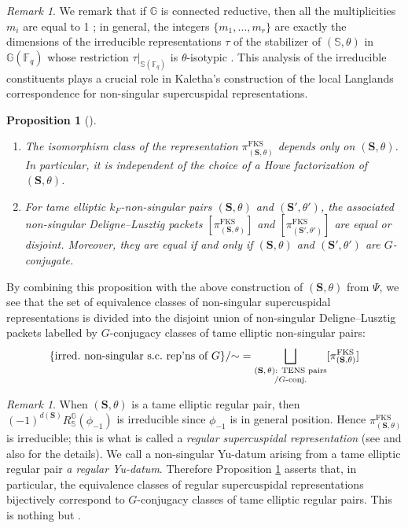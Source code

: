 \documentclass{amsart}
\newcommand{\FKS}{\mathrm{FKS}}
\newcommand{\FF}{\mathbb{F}}
\newcommand{\bbS}{\mathbb{S}}
\newcommand{\bbG}{\mathbb{G}}
\newcommand{\bfS}{\mathbf{S}}
\theoremstyle{plain}
\newtheorem{prop}[thm]{Proposition}
\theoremstyle{definition}
\theoremstyle{remark}
\newtheorem{rem}[thm]{Remark}
\theoremstyle{theorem}
\begin{document}
\begin{rem}\label{rem:parametrization}
We remark that if $\bbG$ is connected reductive, then all the multiplicities $m_i$ are equal to 1 \cite{Lus88}; in general, the integers $\{m_1,\ldots, m_r\}$ are exactly the dimensions of the irreducible representations $\tau$ of the stabilizer of $(\bbS,\theta)$ in $\bbG(\FF_q)$ whose restriction $\tau|_{\bbS(\FF_q)}$ is $\theta$-isotypic \cite{Kal19-sc}. 
This analysis of the irreducible constituents plays a crucial role in Kaletha's construction of the local Langlands correspondence for non-singular supercuspidal representations.
\end{rem}

\begin{prop}[{\cite[Corollary 3.4.7]{Kal19-sc}}]\label{prop:DL-packet}
\begin{enumerate}
\item
The isomorphism class of the representation $\pi_{(\bfS,\theta)}^{\FKS}$ depends only on $(\bfS,\theta)$.
In particular, it is independent of the choice of a Howe factorization of $(\bfS,\theta)$.
\item
For tame elliptic $k_{F}$-non-singular pairs $(\bfS,\theta)$ and $(\bfS',\theta')$, the associated non-singular Deligne--Lusztig packets $[\pi_{(\bfS,\theta)}^{\FKS}]$ and $[\pi_{(\bfS',\theta')}^{\FKS}]$ are equal or disjoint.
Moreover, they are equal if and only if $(\bfS,\theta)$ and $(\bfS',\theta')$ are $G$-conjugate.
\end{enumerate}
\end{prop}

By combining this proposition with the above construction of $(\bfS,\theta)$ from $\Psi$, we see that the set of equivalence classes of non-singular supercuspidal representations is divided into the disjoint union of non-singular Deligne--Lusztig packets labelled by $G$-conjugacy classes of tame elliptic non-singular pairs:
\[
\{\text{irred.\ non-singular s.c.\ rep'ns of $G$}\}/{\sim}
=
\bigsqcup_{\begin{subarray}{c} \text{$(\bfS,\theta)$: TENS pairs}\\ /\text{$G$-conj.}\end{subarray}}
[\pi_{(\bfS,\theta)}^{\FKS}]
\]

\begin{rem}\label{rem:regular}
When $(\bfS,\theta)$ is a tame elliptic regular pair, then $(-1)^{d(\bfS)}R_{\bbS}^{\bbG}(\phi_{-1})$ is irreducible since $\phi_{-1}$ is in general position.
Hence $\pi_{(\bfS,\theta)}^{\FKS}$ is irreducible; this is what is called a \textit{regular supercuspidal representation} (see \cite[Section 3]{Kal19} and also \cite[Section 3.2]{CO21} for the details).
We call a non-singular Yu-datum arising from a tame elliptic regular pair \textit{a regular Yu-datum}.
Therefore Proposition \ref{prop:DL-packet} asserts that, in particular, the equivalence classes of regular supercuspidal representations bijectively correspond to $G$-conjugacy classes of tame elliptic regular pairs.
This is nothing but \cite[Proposition 3.7.8]{Kal19}.
\end{rem}
\end{document}

